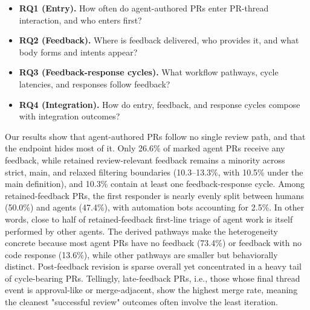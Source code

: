 \documentclass[10pt,conference,anonymous]{IEEEtran}
\begin{document}
\begin{itemize}
    \item \textbf{RQ1 (Entry).} How often do agent-authored PRs enter PR-thread interaction, and who enters first?
    \item \textbf{RQ2 (Feedback).} Where is feedback delivered, who provides it, and what body forms and intents appear?
    \item \textbf{RQ3 (Feedback-response cycles).} What workflow pathways, cycle latencies, and responses follow feedback?
    \item \textbf{RQ4 (Integration).} How do entry, feedback, and response cycles compose with integration outcomes?
\end{itemize}

Our results show that agent-authored PRs follow no single review path, and that the endpoint hides most of it.
Only 26.6\% of marked agent PRs receive any feedback, while retained review-relevant feedback remains a minority across strict, main, and relaxed filtering boundaries (10.3--13.3\%, with 10.5\% under the main definition), and 10.3\% contain at least one feedback-response cycle.
Among retained-feedback PRs, the first responder is nearly evenly split between humans (50.0\%) and agents (47.4\%), with automation bots accounting for 2.5\%.
In other words, close to half of retained-feedback first-line triage of agent work is itself performed by other agents.
The derived pathways make the heterogeneity concrete because most agent PRs have no feedback (73.4\%) or feedback with no code response (13.6\%), while other pathways are smaller but behaviorally distinct.
Post-feedback revision is sparse overall yet concentrated in a heavy tail of cycle-bearing PRs.
Tellingly, late-feedback PRs, i.e., those whose final thread event is approval-like or merge-adjacent, show the highest merge rate, meaning the cleanest "successful review" outcomes often involve the least iteration.
\end{document}
